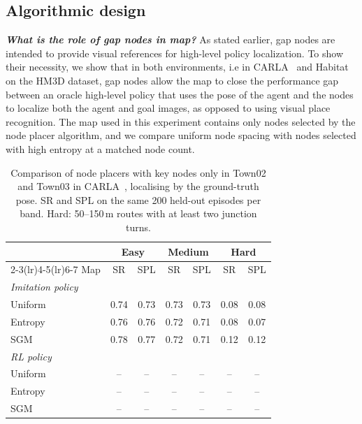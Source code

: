 \subsection{Algorithmic design}
\textit{\textbf{What is the role of gap nodes in map?}}
As stated earlier, gap nodes are intended to provide visual references for high-level policy localization. To show their necessity, we show that in both environments, i.e in CARLA~\cite{dosovitskiy2017carla} and Habitat~\cite{habitat19iccv} on the HM3D dataset, gap nodes allow the map to close the performance gap between an oracle high-level policy that uses the pose of the agent and the nodes to localize both the agent and goal images, as opposed to using visual place recognition. The map used in this experiment contains only nodes selected by the node placer algorithm, and we compare uniform node spacing with nodes selected with high entropy at a matched node count.
\begin{table}[H]
\centering
\footnotesize
\setlength{\tabcolsep}{3.5pt}
\caption{Comparison of node placers with key nodes only in Town02 and Town03 in
CARLA~\cite{dosovitskiy2017carla}, localising by the ground-truth pose. SR and SPL
on the same 200 held-out episodes per band. Hard: 50--150\,m routes with at least
two junction turns.}
\label{tab:map_navigation_pose}
\begin{tabular}{lcccccc}
\toprule
 & \multicolumn{2}{c}{Easy} & \multicolumn{2}{c}{Medium} & \multicolumn{2}{c}{Hard} \\
\cmidrule(lr){2-3}\cmidrule(lr){4-5}\cmidrule(lr){6-7}
Map & SR & SPL & SR & SPL & SR & SPL \\
\midrule
\multicolumn{7}{l}{\textit{Imitation policy}} \\
\rowcolor{gray!15}Uniform & 0.74 & 0.73 & 0.73 & 0.73 & 0.08 & 0.08 \\
\rowcolor{blue!12}Entropy & 0.76 & 0.76 & 0.72 & 0.71 & 0.08 & 0.07 \\
SGM & 0.78 & 0.77 & 0.72 & 0.71 & 0.12 & 0.12 \\
\midrule
\multicolumn{7}{l}{\textit{RL policy}} \\
\rowcolor{gray!15}Uniform & -- & -- & -- & -- & -- & -- \\
\rowcolor{blue!12}Entropy & -- & -- & -- & -- & -- & -- \\
SGM & -- & -- & -- & -- & -- & -- \\
\bottomrule
\end{tabular}
\end{table}

